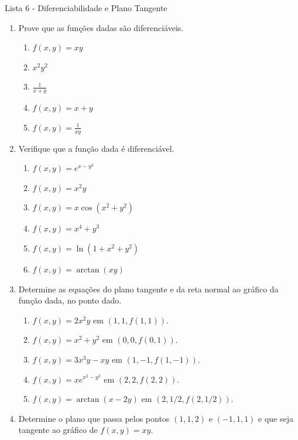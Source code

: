 \documentclass[11pt,a4paper]{article}
\begin{document}
	\begin{center}
		\Large Lista 6 - Diferenciabilidade e Plano Tangente
	\end{center}
	
	\begin{enumerate}
	
	\item Prove que as funções dadas são diferenciáveis.
	
	\begin{enumerate}
		\item $f(x,y) = xy$
		\item $x^2y^2$
		\item $\displaystyle\frac{1}{x + y}$
		\item $f(x,y) = x + y$
		\item $f(x,y) = \displaystyle\frac{1}{xy}$
	\end{enumerate}
	
	\item Verifique que a função dada é diferenciável.	
	
	\begin{enumerate}
		\item $f(x,y) = e^{x - y^2}$
		\item $f(x,y) = x^2y$
		\item $f(x,y) = x \cos (x^2 + y^2)$
		\item $f(x,y) = x^4 + y^3$
		\item $f(x,y) = \ln (1 + x^2 + y^2)$
		\item $f(x,y) = \arctan (xy)$
	\end{enumerate}		
	
	\item Determine as equações do plano tangente e da reta normal ao gráfico da função dada, no ponto dado.
	
	\begin{enumerate}
		\item $f(x,y) = 2x^2y$ em $(1,1,f(1,1))$.
		\item $f(x,y) = x^2 + y^2$ em $(0,0,f(0,1))$.
		\item $f(x,y) = 3x^3y - xy$ em $(1,-1,f(1,-1))$.
		\item $f(x,y) = xe^{x^2 - y^2}$ em $(2,2,f(2,2))$.
		\item $f(x,y) = \arctan (x - 2y)$ em $(2,1/2,f(2,1/2))$.
	\end{enumerate}
	
	\item Determine o plano que passa pelos pontos $(1,1,2)$ e $(-1,1,1)$ e que seja tangente ao gráfico de $f(x,y) = xy$.
	

\end{enumerate}
\end{document}

